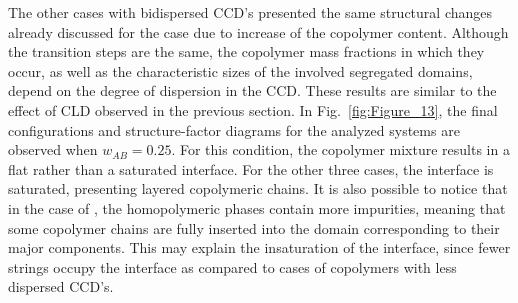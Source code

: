 \documentclass[
journal=mamobx,
manuscript=article,
]{achemso}
\begin{document}
The other cases with bidispersed CCD's presented the same structural changes already discussed for the  case due to increase of the copolymer content.
Although the transition steps are the same, the copolymer mass fractions in which they occur, as well as the characteristic sizes of the involved segregated domains, depend on the degree of dispersion in the CCD.
These results are similar to the effect of CLD observed in the previous section.
In Fig.~\ref{fig:Figure_13}, the final configurations and structure-factor diagrams for the analyzed systems are observed when $w_{AB}=0.25$.
For this condition, the copolymer mixture  results in a flat rather than a saturated interface.
For the other three cases, the interface is saturated, presenting layered copolymeric chains.
It is also possible to notice that in the case of , the homopolymeric phases contain more impurities, meaning that some copolymer chains are fully inserted into the domain corresponding to their major components.
This may explain the insaturation of the interface, since fewer strings occupy the interface as compared to cases of copolymers with less dispersed CCD's.
\end{document}
